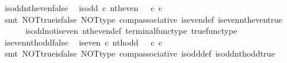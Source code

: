 \begin{isabellebody}
%
\endisatagproof
{\isafoldproof}%
%
\isadelimproof
\isanewline
%
\endisadelimproof
\isanewline
{}\isamarkupfalse%
\ is{\isacharunderscore}{\kern0pt}odd{\isacharunderscore}{\kern0pt}nth{\isacharunderscore}{\kern0pt}even{\isacharunderscore}{\kern0pt}false{\isacharcolon}{\kern0pt}\isanewline
\ \ {\isachardoublequoteopen}is{\isacharunderscore}{\kern0pt}odd\ {\isasymcirc}\isactrlsub c\ nth{\isacharunderscore}{\kern0pt}even\ {\isacharequal}{\kern0pt}\ {\isasymf}\ {\isasymcirc}\isactrlsub c\ {\isasymbeta}\isactrlbsub {\isasymnat}\isactrlsub c\isactrlesub {\isachardoublequoteclose}\isanewline
%
\isadelimproof
\ \ %
\endisadelimproof
%
\isatagproof
{}\isamarkupfalse%
\ {\isacharparenleft}{\kern0pt}smt\ NOT{\isacharunderscore}{\kern0pt}true{\isacharunderscore}{\kern0pt}is{\isacharunderscore}{\kern0pt}false\ NOT{\isacharunderscore}{\kern0pt}type\ comp{\isacharunderscore}{\kern0pt}associative{}\ is{\isacharunderscore}{\kern0pt}even{\isacharunderscore}{\kern0pt}def{}\ is{\isacharunderscore}{\kern0pt}even{\isacharunderscore}{\kern0pt}nth{\isacharunderscore}{\kern0pt}even{\isacharunderscore}{\kern0pt}true\isanewline
\ \ \ \ \ \ is{\isacharunderscore}{\kern0pt}odd{\isacharunderscore}{\kern0pt}not{\isacharunderscore}{\kern0pt}is{\isacharunderscore}{\kern0pt}even\ nth{\isacharunderscore}{\kern0pt}even{\isacharunderscore}{\kern0pt}def{}\ terminal{\isacharunderscore}{\kern0pt}func{\isacharunderscore}{\kern0pt}type\ true{\isacharunderscore}{\kern0pt}func{\isacharunderscore}{\kern0pt}type{\isacharparenright}{\kern0pt}%
\endisatagproof
{\isafoldproof}%
%
\isadelimproof
\isanewline
%
\endisadelimproof
\isanewline
{}\isamarkupfalse%
\ is{\isacharunderscore}{\kern0pt}even{\isacharunderscore}{\kern0pt}nth{\isacharunderscore}{\kern0pt}odd{\isacharunderscore}{\kern0pt}false{\isacharcolon}{\kern0pt}\isanewline
\ \ {\isachardoublequoteopen}is{\isacharunderscore}{\kern0pt}even\ {\isasymcirc}\isactrlsub c\ nth{\isacharunderscore}{\kern0pt}odd\ {\isacharequal}{\kern0pt}\ {\isasymf}\ {\isasymcirc}\isactrlsub c\ {\isasymbeta}\isactrlbsub {\isasymnat}\isactrlsub c\isactrlesub {\isachardoublequoteclose}\isanewline
%
\isadelimproof
\ \ %
\endisadelimproof
%
\isatagproof
{}\isamarkupfalse%
\ {\isacharparenleft}{\kern0pt}smt\ NOT{\isacharunderscore}{\kern0pt}true{\isacharunderscore}{\kern0pt}is{\isacharunderscore}{\kern0pt}false\ NOT{\isacharunderscore}{\kern0pt}type\ comp{\isacharunderscore}{\kern0pt}associative{}\ is{\isacharunderscore}{\kern0pt}odd{\isacharunderscore}{\kern0pt}def{}\ is{\isacharunderscore}{\kern0pt}odd{\isacharunderscore}{\kern0pt}nth{\isacharunderscore}{\kern0pt}odd{\isacharunderscore}{\kern0pt}true\isanewline

\end{isabellebody}
